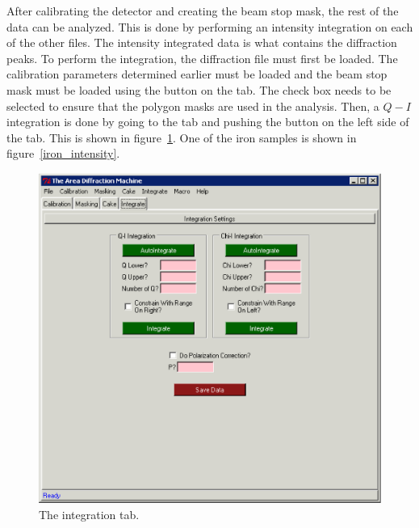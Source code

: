 After calibrating the detector and creating the beam stop mask, 
the rest of the data can be analyzed. This is done by 
performing an intensity integration on each of the other files.
The intensity integrated data is what contains the diffraction peaks.
To perform the integration, the diffraction file must first be loaded.
The calibration parameters determined earlier must be loaded and the
beam stop mask must be loaded using the  button on the
 tab. The  check box needs to
be selected to ensure that the polygon masks are used in the analysis.
Then, a $Q-I$ integration is done by going to the  tab
and pushing the  button on the left side of the tab.
This is shown in figure~\ref{integration_tab_example}.
One of the iron samples is shown in figure~\ref{iron_intensity}.

\begin{figure}
    \centering
    \includegraphics[scale=.75]
    {figures/integration_tab.eps}
    \caption{The integration tab.}
    \label{integration_tab_example}
\end{figure}

